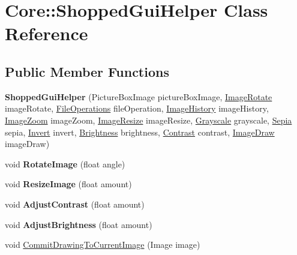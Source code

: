 \hypertarget{class_core_1_1_shopped_gui_helper}{
\section{Core::ShoppedGuiHelper Class Reference}
\label{class_core_1_1_shopped_gui_helper}
}
\subsection*{Public Member Functions}
\begin{DoxyCompactItemize}
\item 
\hypertarget{class_core_1_1_shopped_gui_helper_abf8fe810fea4a4420ec1833ee9abfb87}{
{\bfseries ShoppedGuiHelper} (PictureBoxImage pictureBoxImage, \hyperlink{class_core_1_1_manipulators_1_1_image_rotate}{ImageRotate} imageRotate, \hyperlink{class_core_1_1_file_operations}{FileOperations} fileOperation, \hyperlink{class_core_1_1_image_history}{ImageHistory} imageHistory, \hyperlink{class_core_1_1_manipulators_1_1_image_zoom}{ImageZoom} imageZoom, \hyperlink{class_core_1_1_manipulators_1_1_image_resize}{ImageResize} imageResize, \hyperlink{class_core_1_1_filters_1_1_grayscale}{Grayscale} grayscale, \hyperlink{class_core_1_1_filters_1_1_sepia}{Sepia} sepia, \hyperlink{class_core_1_1_filters_1_1_invert}{Invert} invert, \hyperlink{class_core_1_1_manipulators_1_1_brightness}{Brightness} brightness, \hyperlink{class_core_1_1_manipulators_1_1_contrast}{Contrast} contrast, \hyperlink{class_core_1_1_manipulators_1_1_image_draw}{ImageDraw} imageDraw)}
\label{class_core_1_1_shopped_gui_helper_abf8fe810fea4a4420ec1833ee9abfb87}

\item 
\hypertarget{class_core_1_1_shopped_gui_helper_a11dd6cb5def550b0a3ef9332a1921ced}{
void {\bfseries RotateImage} (float angle)}
\label{class_core_1_1_shopped_gui_helper_a11dd6cb5def550b0a3ef9332a1921ced}

\item 
\hypertarget{class_core_1_1_shopped_gui_helper_ae055ea35c2e8f3f33199ba8f5d8eeb7b}{
void {\bfseries ResizeImage} (float amount)}
\label{class_core_1_1_shopped_gui_helper_ae055ea35c2e8f3f33199ba8f5d8eeb7b}

\item 
\hypertarget{class_core_1_1_shopped_gui_helper_a4199c3c5715003cc56c5f68e1d92828c}{
void {\bfseries AdjustContrast} (float amount)}
\label{class_core_1_1_shopped_gui_helper_a4199c3c5715003cc56c5f68e1d92828c}

\item 
\hypertarget{class_core_1_1_shopped_gui_helper_accce937556fa3e22f49a4e50dd385319}{
void {\bfseries AdjustBrightness} (float amount)}
\label{class_core_1_1_shopped_gui_helper_accce937556fa3e22f49a4e50dd385319}

\item 
void \hyperlink{class_core_1_1_shopped_gui_helper_abdeacf592b564050489f0c9c7c0f6f43}{CommitDrawingToCurrentImage} (Image image)
\end{DoxyCompactItemize}
